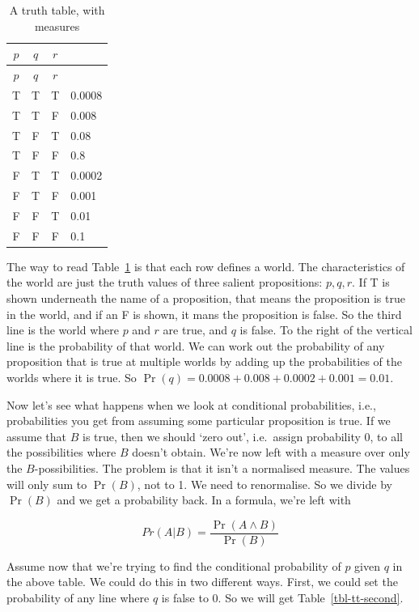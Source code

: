 \documentclass[
  11pt,
  letterpaper,
]{scrbook}
\begin{document}
\begin{longtable}[]{@{}cccl@{}}
\caption{A truth table, with
measures}\label{tbl-tt-first}\tabularnewline
\toprule\noalign{}
\(p\) & \(q\) & \(r\) & \\
\midrule\noalign{}
\endfirsthead
\toprule\noalign{}
\(p\) & \(q\) & \(r\) & \\
\midrule\noalign{}
\endhead
\bottomrule\noalign{}
\endlastfoot
T & T & T & 0.0008 \\
T & T & F & 0.008 \\
T & F & T & 0.08 \\
T & F & F & 0.8 \\
F & T & T & 0.0002 \\
F & T & F & 0.001 \\
F & F & T & 0.01 \\
F & F & F & 0.1 \\
\end{longtable}

The way to read Table~\ref{tbl-tt-first} is that each row defines a
world. The characteristics of the world are just the truth values of
three salient propositions: \(p, q, r\). If T is shown underneath the
name of a proposition, that means the proposition is true in the world,
and if an F is shown, it mans the proposition is false. So the third
line is the world where \(p\) and \(r\) are true, and \(q\) is false. To
the right of the vertical line is the probability of that world. We can
work out the probability of any proposition that is true at multiple
worlds by adding up the probabilities of the worlds where it is true. So
\(\Pr(q) = 0.0008 + 0.008 + 0.0002 + 0.001 = 0.01\).

Now let's see what happens when we look at conditional probabilities,
i.e., probabilities you get from assuming some particular proposition is
true. If we assume that \(B\) is true, then we should `zero out',
i.e.~assign probability 0, to all the possibilities where \(B\) doesn't
obtain. We're now left with a measure over only the \(B\)-possibilities.
The problem is that it isn't a normalised measure. The values will only
sum to \(\Pr(B)\), not to 1. We need to renormalise. So we divide by
\(\Pr(B)\) and we get a probability back. In a formula, we're left with

\begin{equation*}
Pr(A|B) = \frac{\Pr(A \wedge B)}{\Pr(B)}
\end{equation*}

Assume now that we're trying to find the conditional probability of
\(p\) given \(q\) in the above table. We could do this in two different
ways. First, we could set the probability of any line where \(q\) is
false to 0. So we will get Table~\ref{tbl-tt-second}.
\end{document}
